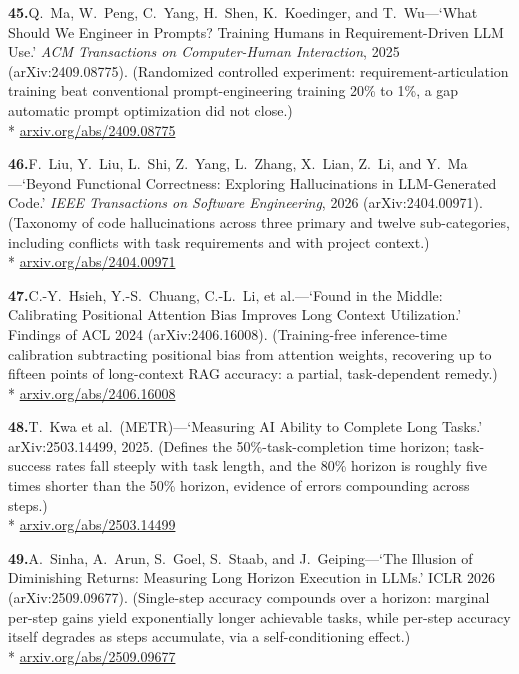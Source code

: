 \documentclass[11pt, a4paper]{article}
\begin{document}
\noindent\textbf{45.}\enspace Q.~Ma, W.~Peng, C.~Yang, H.~Shen, K.~Koedinger, and
T.~Wu---`What Should We Engineer in Prompts? Training Humans in Requirement-Driven LLM
Use.' \textit{ACM Transactions on Computer-Human Interaction}, 2025 (arXiv:2409.08775).
(Randomized controlled experiment: requirement-articulation training beat conventional
prompt-engineering training 20\% to 1\%, a gap automatic prompt optimization did not
close.)\\*
{\fontsize{8}{10}\selectfont\color{midb}
\href{https://arxiv.org/abs/2409.08775}{arxiv.org/abs/2409.08775}}


\noindent\textbf{46.}\enspace F.~Liu, Y.~Liu, L.~Shi, Z.~Yang, L.~Zhang, X.~Lian, Z.~Li,
and Y.~Ma---`Beyond Functional Correctness: Exploring Hallucinations in LLM-Generated
Code.' \textit{IEEE Transactions on Software Engineering}, 2026 (arXiv:2404.00971).
(Taxonomy of code hallucinations across three primary and twelve sub-categories, including
conflicts with task requirements and with project context.)\\*
{\fontsize{8}{10}\selectfont\color{midb}
\href{https://arxiv.org/abs/2404.00971}{arxiv.org/abs/2404.00971}}


\noindent\textbf{47.}\enspace C.-Y.~Hsieh, Y.-S.~Chuang, C.-L.~Li, et al.---`Found in the
Middle: Calibrating Positional Attention Bias Improves Long Context Utilization.' Findings
of ACL 2024 (arXiv:2406.16008). (Training-free inference-time calibration subtracting
positional bias from attention weights, recovering up to fifteen points of long-context
RAG accuracy: a partial, task-dependent remedy.)\\*
{\fontsize{8}{10}\selectfont\color{midb}
\href{https://arxiv.org/abs/2406.16008}{arxiv.org/abs/2406.16008}}


\noindent\textbf{48.}\enspace T.~Kwa et al.\ (METR)---`Measuring AI Ability to Complete
Long Tasks.' arXiv:2503.14499, 2025. (Defines the 50\%-task-completion time horizon;
task-success rates fall steeply with task length, and the 80\% horizon is roughly five
times shorter than the 50\% horizon, evidence of errors compounding across steps.)\\*
{\fontsize{8}{10}\selectfont\color{midb}
\href{https://arxiv.org/abs/2503.14499}{arxiv.org/abs/2503.14499}}


\noindent\textbf{49.}\enspace A.~Sinha, A.~Arun, S.~Goel, S.~Staab, and J.~Geiping---`The
Illusion of Diminishing Returns: Measuring Long Horizon Execution in LLMs.' ICLR 2026
(arXiv:2509.09677). (Single-step accuracy compounds over a horizon: marginal per-step
gains yield exponentially longer achievable tasks, while per-step accuracy itself degrades
as steps accumulate, via a self-conditioning effect.)\\*
{\fontsize{8}{10}\selectfont\color{midb}
\href{https://arxiv.org/abs/2509.09677}{arxiv.org/abs/2509.09677}}
\end{document}
